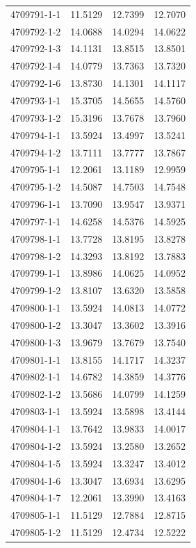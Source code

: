 \begin{longtable}{lrrr}
4709791-1-1 & 11.5129 & 12.7399 & 12.7070 \\
4709792-1-2 & 14.0688 & 14.0294 & 14.0622 \\
4709792-1-3 & 14.1131 & 13.8515 & 13.8501 \\
4709792-1-4 & 14.0779 & 13.7363 & 13.7320 \\
4709792-1-6 & 13.8730 & 14.1301 & 14.1117 \\
4709793-1-1 & 15.3705 & 14.5655 & 14.5760 \\
4709793-1-2 & 15.3196 & 13.7678 & 13.7960 \\
4709794-1-1 & 13.5924 & 13.4997 & 13.5241 \\
4709794-1-2 & 13.7111 & 13.7777 & 13.7867 \\
4709795-1-1 & 12.2061 & 13.1189 & 12.9959 \\
4709795-1-2 & 14.5087 & 14.7503 & 14.7548 \\
4709796-1-1 & 13.7090 & 13.9547 & 13.9371 \\
4709797-1-1 & 14.6258 & 14.5376 & 14.5925 \\
4709798-1-1 & 13.7728 & 13.8195 & 13.8278 \\
4709798-1-2 & 14.3293 & 13.8192 & 13.7883 \\
4709799-1-1 & 13.8986 & 14.0625 & 14.0952 \\
4709799-1-2 & 13.8107 & 13.6320 & 13.5858 \\
4709800-1-1 & 13.5924 & 14.0813 & 14.0772 \\
4709800-1-2 & 13.3047 & 13.3602 & 13.3916 \\
4709800-1-3 & 13.9679 & 13.7679 & 13.7540 \\
4709801-1-1 & 13.8155 & 14.1717 & 14.3237 \\
4709802-1-1 & 14.6782 & 14.3859 & 14.3776 \\
4709802-1-2 & 13.5686 & 14.0799 & 14.1259 \\
4709803-1-1 & 13.5924 & 13.5898 & 13.4144 \\
4709804-1-1 & 13.7642 & 13.9833 & 14.0017 \\
4709804-1-2 & 13.5924 & 13.2580 & 13.2652 \\
4709804-1-5 & 13.5924 & 13.3247 & 13.4012 \\
4709804-1-6 & 13.3047 & 13.6934 & 13.6295 \\
4709804-1-7 & 12.2061 & 13.3990 & 13.4163 \\
4709805-1-1 & 11.5129 & 12.7884 & 12.8715 \\
4709805-1-2 & 11.5129 & 12.4734 & 12.5222 \\

\end{longtable}
